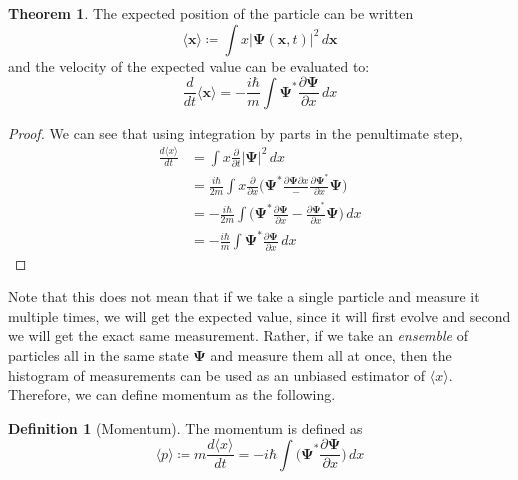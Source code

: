 \documentclass{article}
\theoremstyle{definition}
\newtheorem{theorem}{Theorem}[section]
\newtheorem{definition}{Definition}[section]
\begin{document}
  \begin{theorem} 
    The expected position of the particle can be written
    \begin{equation} 
      \langle \mathbf{x} \rangle \coloneqq \int x |\boldsymbol{\Psi}(\mathbf{x}, t)|^2 \,d \mathbf{x}
    \end{equation}
    and the velocity of the expected value can be evaluated to: 
    \begin{equation} 
      \frac{d}{dt} \langle \mathbf{x} \rangle = -\frac{i \hbar}{m} \int \boldsymbol{\Psi}^\ast \frac{\partial \boldsymbol{\Psi}}{\partial x} \,dx
    \end{equation}
  \end{theorem}
  \begin{proof} 
    We can see that using integration by parts in the penultimate step, 
    \begin{align} 
      \frac{d \langle x \rangle}{dt} & = \int x \frac{\partial}{\partial t} |\boldsymbol{\Psi}|^2 \,dx \\
                                     & = \frac{i \hbar}{2m} \int x \frac{\partial}{\partial x} \bigg( \boldsymbol{\Psi}^\ast \frac{\partial \boldsymbol{\Psi}{\partial x}} - \frac{\partial \boldsymbol{\Psi}^\ast}{\partial x} \boldsymbol{\Psi} \bigg) \\
                                     & = - \frac{i \hbar}{2m} \int \bigg( \boldsymbol{\Psi}^\ast \frac{\partial \boldsymbol{\Psi}}{\partial x} - \frac{\partial \boldsymbol{\Psi}^\ast}{\partial x} \boldsymbol{\Psi} \bigg) \,dx \\
                                     & = -\frac{i \hbar}{m} \int \boldsymbol{\Psi}^\ast \frac{\partial \boldsymbol{\Psi}}{\partial x} \,dx
    \end{align}
  \end{proof}

  Note that this does not mean that if we take a single particle and measure it multiple times, we will get the expected value, since it will first evolve and second we will get the exact same measurement. Rather, if we take an \textit{ensemble} of particles all in the same state $\mathbf{\Psi}$ and measure them all at once, then the histogram of measurements can be used as an unbiased estimator of $\langle x \rangle$. Therefore, we can define momentum as the following. 

  \begin{definition}[Momentum]
    The momentum is defined as 
    \begin{equation} 
      \langle p \rangle \coloneqq m \frac{d \langle x \rangle}{dt} = - i\hbar \int \bigg( \boldsymbol{\Psi}^\ast \frac{\partial \boldsymbol{\Psi}}{\partial x} \bigg)  \,dx
    \end{equation}
  \end{definition}
\end{document}
